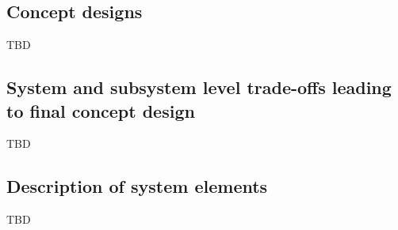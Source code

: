 \documentclass[../main.tex]{subfiles}
\begin{document}
\subsection{Concept designs}\label{concept-designs}

TBD

\subsection{System and subsystem level trade-offs leading to final
concept
design}\label{trade-offs}

TBD

\subsection{Description of system
elements}\label{description-of-system-elements}

TBD

\newpage
\thispagestyle{noheader}
\end{document}
